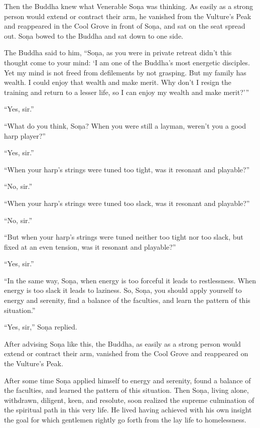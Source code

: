 \documentclass[12pt,openany]{book}%
\begin{document}
Then the Buddha knew what Venerable \textsanskrit{Soṇa} was thinking. As easily as a strong person would extend or contract their arm, he vanished from the Vulture’s Peak and reappeared in the Cool Grove in front of \textsanskrit{Soṇa}, and sat on the seat spread out. \textsanskrit{Soṇa} bowed to the Buddha and sat down to one side. 

The Buddha said to him, “\textsanskrit{Soṇa}, as you were in private retreat didn’t this thought come to your mind: ‘I am one of the Buddha’s most energetic disciples. Yet my mind is not freed from defilements by not grasping. But my family has wealth. I could enjoy that wealth and make merit. Why don’t I resign the training and return to a lesser life, so I can enjoy my wealth and make merit?’” 

“Yes, sir.” 

“What do you think, \textsanskrit{Soṇa}? When you were still a layman, weren’t you a good harp player?” 

“Yes, sir.” 

“When your harp’s strings were tuned too tight, was it resonant and playable?” 

“No, sir.” 

“When your harp’s strings were tuned too slack, was it resonant and playable?” 

“No, sir.” 

“But when your harp’s strings were tuned neither too tight nor too slack, but fixed at an even tension, was it resonant and playable?” 

“Yes, sir.” 

“In the same way, \textsanskrit{Soṇa}, when energy is too forceful it leads to restlessness. When energy is too slack it leads to laziness. So, \textsanskrit{Soṇa}, you should apply yourself to energy and serenity, find a balance of the faculties, and learn the pattern of this situation.” 

“Yes, sir,” \textsanskrit{Soṇa} replied. 

After advising \textsanskrit{Soṇa} like this, the Buddha, as easily as a strong person would extend or contract their arm, vanished from the Cool Grove and reappeared on the Vulture’s Peak. 

After some time \textsanskrit{Soṇa} applied himself to energy and serenity, found a balance of the faculties, and learned the pattern of this situation. Then \textsanskrit{Soṇa}, living alone, withdrawn, diligent, keen, and resolute, soon realized the supreme culmination of the spiritual path in this very life. He lived having achieved with his own insight the goal for which gentlemen rightly go forth from the lay life to homelessness. 
\end{document}
